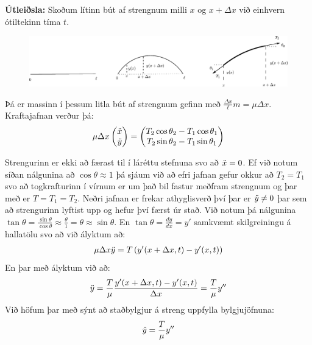 \ifdefined \wholebook \else\documentclass[oneside]{book}\usepackage{EdlBook}\graphicspath{{figures/}}
\begin{document}
\textbf{Útleiðsla:} Skoðum lítinn bút af strengnum milli $x$ og $x + \Delta x$ við einhvern ótiltekinn tíma $t$.

\begin{figure}[H]
    \centering
    \vspace{-0.4cm}
    \includegraphics[scale = 0.9]{figures/strengur-deriv.pdf}
    \label{fig:standing-waves}
\end{figure}

\vspace{-0.4cm}
Þá er massinn í þessum litla bút af strengnum gefinn með $\frac{\Delta x}{\ell} m = \mu \Delta x$. Kraftajafnan verður þá:
\begin{align*}
   \mu \Delta x \begin{pmatrix}  \Ddot{x} \\  \Ddot{y} \end{pmatrix} = \begin{pmatrix} T_2 \cos\theta_2 - T_1 \cos\theta_1 \\ T_2 \sin\theta_2 - T_1\sin\theta_1 \end{pmatrix}
\end{align*}

Strengurinn er ekki að færast til í láréttu stefnuna svo að $\Ddot{x} = 0$. Ef við notum síðan nálgunina að $\cos\theta \approx 1$ þá sjáum við að efri jafnan gefur okkur að $T_2 = T_1$ svo að togkrafturinn í vírnum er um það bil fastur meðfram strengnum og þar með er $T = T_1 = T_2$. Neðri jafnan er frekar athyglisverð því þar er $\Ddot{y} \neq 0$ þar sem að strengurinn lyftist upp og hefur því færst úr stað. Við notum þá nálgunina $\tan\theta = \frac{\sin\theta}{\cos\theta} \approx \frac{\theta}{1} = \theta \approx \sin\theta$. En $\tan\theta = \frac{dy}{dx} = y'$ samkvæmt skilgreiningu á hallatölu svo að við ályktum að:
\begin{align*}
    \mu \Delta x \Ddot{y} = T\left( y'(x+\Delta x,t) - y'(x,t) \right)
\end{align*}
En þar með ályktum við að:
\begin{align*}
    \Ddot{y} = \frac{T}{\mu} \frac{y'(x+\Delta x,t)-y'(x,t)}{\Delta x} = \frac{T}{\mu} y''
\end{align*}
Við höfum þar með sýnt að staðbylgjur á streng uppfylla bylgjujöfnuna:
\begin{align*}
    \Ddot{y} = \frac{T}{\mu} y''
\end{align*}
\end{document}
